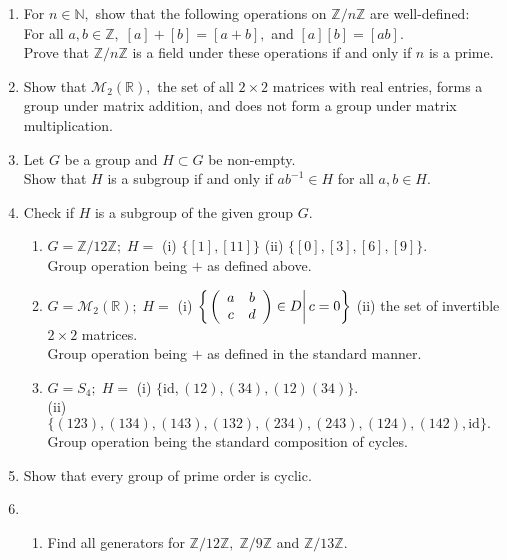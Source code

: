\begin{enumerate}[label=(\arabic*)]
	\item For $n \in \mathbb{N},$ show that the following operations on $\mathbb{Z}/n\mathbb{Z}$ are well-defined:\\
	For all $a, b \in \mathbb{Z},\;[a] + [b] = [a+b],$ and $[a][b]=[ab].$\\
	Prove that $\mathbb{Z}/n\mathbb{Z}$ is a field under these operations if and only if $n$ is a prime.
	\item Show that $\mathcal{M}_2(\mathbb{R}),$ the set of all $2\times2$ matrices with real entries, forms a group under matrix addition, and does not form a group under matrix multiplication.
	\item Let $G$ be a group and $H \subset G$ be non-empty.\\
	Show that $H$ is a subgroup if and only if $ab^{-1} \in H$ for all $a, b \in H.$
	\item Check if $H$ is a subgroup of the given group $G.$
	\begin{enumerate}[nosep] 
		\item $G = \mathbb{Z}/12\mathbb{Z};\; H = $ (i) $\{[1], [11]\}$ \hspace{1 cm} (ii) $\{[0], [3], [6], [9]\}.$\\
		Group operation being $+$ as defined above.
		\item $G = \mathcal{M}_2(\mathbb{R});\; H = $ (i) $\left\{\left.\left(\begin{array}{c c}	a & b\\ c & d \end{array}\right) \in D \right| c = 0\right\}$ (ii) the set of invertible $2\times2$ matrices.\\
		Group operation being $+$ as defined in the standard manner.
		\item $G = S_4;\; H = $ (i) $\{\text{id}, (12), (34), (12)(34)\}.$\\
		(ii) $\{(123), (134), (143), (132), (234), (243), (124), (142), \text{id}\}.$\\
		Group operation being the standard composition of cycles.
	\end{enumerate}
	\item Show that every group of prime order is cyclic.
	\item 
	\begin{enumerate}[nosep] 
		\item Find all generators for $\mathbb{Z}/12\mathbb{Z},\; \mathbb{Z}/9\mathbb{Z}$ and $\mathbb{Z}/13\mathbb{Z}.$

\end{enumerate}
\end{enumerate}
